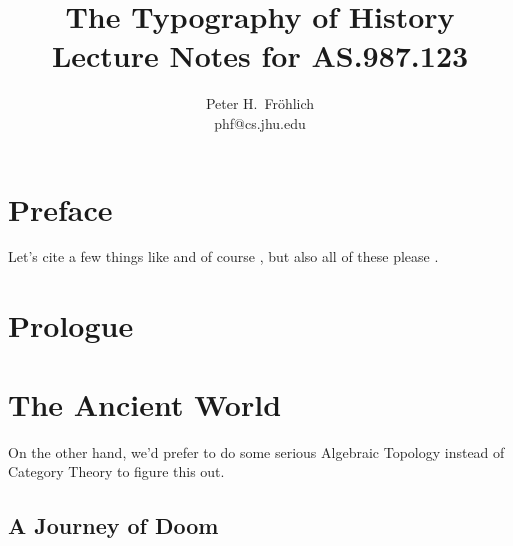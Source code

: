 \documentclass[11pt]{book}
\title{\textbf{The Typography of History}\\
Lecture Notes for AS.987.123}
\author{Peter H.\ Fr{\"o}hlich\\
phf@cs.jhu.edu}
\begin{document}
\frontmatter

\maketitle

\chapter{Preface}

\lipsum[1]

Let's cite a few things like \cite{kant02} and of
course \cite{lamport94}, but also all of these
please \cite{Conway2000,Meyer2000,Huetal2000,LaTeXe,lshort,Gill}.
\lipsum[3-4]

\tableofcontents
\listoffigures
\listoftables

\mainmatter

\chapter{Prologue}
\lipsum[1-10]

\chapter{The Ancient World}
\lipsum[2]

On the other hand, we'd prefer to do some
serious Algebraic Topology
instead of Category Theory to figure this out.

\section{A Journey of Doom}
\lipsum[1-4]
\end{document}
